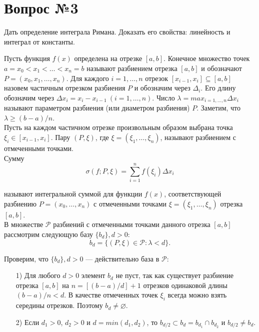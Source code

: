 \documentclass[12pt]{report}
\numberwithin{equation}{section}
\begin{document}
\newpage

\newpage \section{Вопрос №3}  %
\begin{framed}Дать определение интеграла Римана. Доказать его свойства: линейность и интеграл от константы.
\end{framed}

Пусть функция $f(x)$ определена на отрезке $[a,b]$. Конечное множество точек $a = x_0 < x_1 < \ldots < x_n = b$ называют разбиением отрезка $[a,b]$ и обозначают $P = (x_0, x_1, \ldots, x_n)$. Для каждого $i = 1, \ldots, n$ отрезок $[x_{i-1}, x_i] \subseteq [a,b]$ назовем частичным отрезком разбиения $P$ и обозначим через $\Delta_i$. Его длину обозначим через $\Delta x_i = x_i - x_{i-1}~(i = 1, \ldots, n)$. Число $\lambda = max_{i = 1, \ldots, n}\Delta x_i $ называют параметром разбиения (или диаметром разбиения) $P$. Заметим, что $\lambda \geqslant (b-a)/n$.\\

Пусть на каждом частичном отрезке произвольным образом выбрана точка $\xi_i \in [x_{i-1}, x_i]$. Пару $(P, \xi)$, где $\xi = (\xi_1, \ldots, \xi_n)$, называют разбиением с отмеченными точками.\\

Сумму 
\[ \sigma(f;P, \xi) = \sum\limits_{i=1}^{n}f(\xi_i)\Delta x_i\]

называют интегральной суммой для функции $f(x)$, соответствующей разбиению $P = (x_0, \ldots, x_n)$ с отмеченными точками $\xi = (\xi_1, \ldots, \xi_n)$ отрезка $[a,b]$.\\

В множестве $\mathcal{P}$ разбиений с отмеченными точками данного отрезка $[a,b]$ рассмотрим следующую базу $\{b_d\}, d> 0:$
\[ b_d = \{ (P, \xi) \in \mathcal{P} : \lambda < d\}.\]

Проверим, что $\{b_d\}, d> 0$ --- действительно база в $\mathcal{P}$:
\begin{enumerate}
\item [1)] Для любого $d > 0$ элемент $b_d$ не пуст, так как существует разбиение отрезка $[a,b]$ на $n = [(b-a)/d] +1$ отрезков одинаковой длины $(b-a)/n <d$. В качестве отмеченных точек $\xi_i$ всегда можно взять середины отрезков. Поэтому $b_d \neq \varnothing$.
\item [2)] Если $d_1 >0$, $d_2 > 0$ и $d = min(d_1,d_2)$, то $b_{d/2} \subset b_d = b_{d_1} \cap b_{d_2}$ и $b_{d/2} \neq b_d$.
\end{enumerate}
\end{document}
